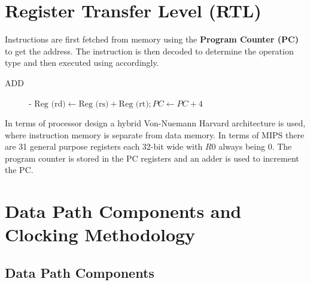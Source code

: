 \documentclass[12pt letter]{report}
\begin{document}
\section{Register Transfer Level (RTL)}


Instructions are first fetched from memory using the \textbf{Program Counter (PC)} to get the address. The instruction is then decoded to determine the operation type and then executed using accordingly.
\begin{description}
  \item[ADD]  - $\text{Reg (rd)} \gets \text{Reg (rs)} + \text{Reg (rt)}; PC \gets PC + 4$
\end{description}

In terms of processor design a hybrid Von-Nuemann Harvard architecture is used, where instruction memory is separate from data memory. In terms of MIPS there are
31 general purpose registers each 32-bit wide with $R0$ always being 0. The program counter is stored in the PC registers and an adder is used to increment the PC.

\section{Data Path Components and Clocking Methodology}

\subsection{Data Path Components}

\end{document}
